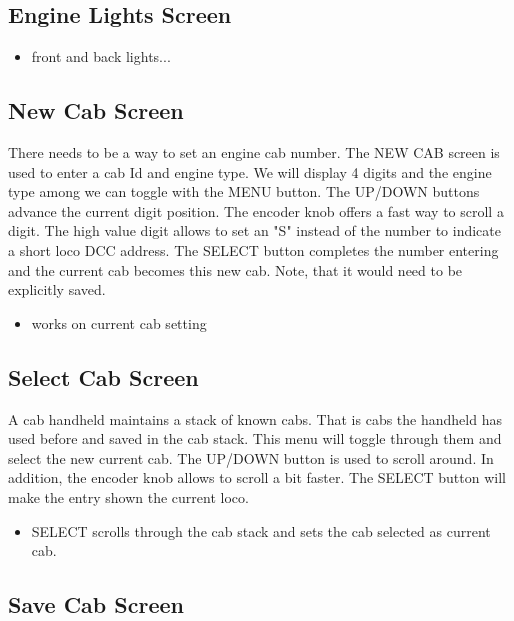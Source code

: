 \subsection{Engine Lights Screen}

\begin{itemize}
\item front and back lights...
\end{itemize}

\subsection{New Cab Screen}

There needs to be a way to set an engine cab number. The NEW CAB screen is used to enter a cab Id and engine type. We will display 4 digits and the engine type among we can toggle with the MENU button. The UP/DOWN buttons advance the current digit position. The encoder knob offers a fast way to scroll a digit. The high value digit allows to set an "S" instead of the number to indicate a short loco DCC address. The SELECT button completes the number entering and the current cab becomes this new cab. Note, that it would need to be explicitly saved.

\begin{itemize}
\item works on current cab setting
\end{itemize}

\subsection{Select Cab Screen}

A cab handheld maintains a stack of known cabs. That is cabs the handheld has used before and saved in the cab stack. This menu will toggle through them and select the new current cab. The UP/DOWN button is used to scroll around. In addition, the encoder knob allows to scroll a bit faster. The SELECT button will make the entry shown the current loco.

\begin{itemize}
\item SELECT scrolls through the cab stack and sets the cab selected as current cab.
\end{itemize}

\subsection{Save Cab Screen}

